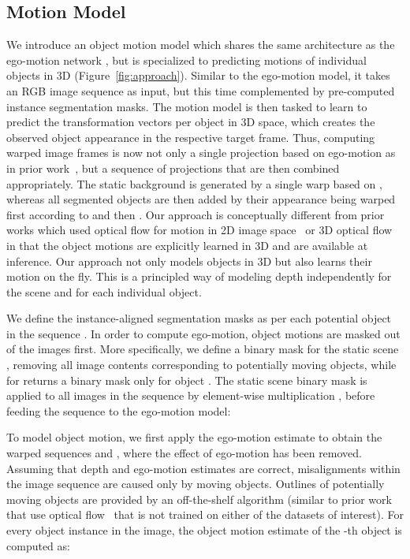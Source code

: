 \documentclass[letterpaper]{article} \usepackage{aaai19}  \usepackage{times}  \usepackage{helvet}  \usepackage{courier}  \usepackage{url}  \usepackage{graphicx}  \frenchspacing
\begin{document}
\subsection{Motion Model}
We introduce an object motion model  which shares the same architecture as the ego-motion network , but is specialized to predicting motions of individual objects in 3D (Figure~\ref{fig:approach}). Similar to the ego-motion model, it takes an RGB image sequence as input, but this time complemented by pre-computed instance segmentation masks. The motion model is then tasked to learn to predict the transformation vectors per object in 3D space, which creates the observed object appearance in the respective target frame. Thus, computing warped image frames is now not only a single projection based on ego-motion as in prior work~\cite{zhou2017unsupervised}, but a sequence of projections that are then combined appropriately. The static background is generated by a single warp based on , whereas all segmented objects are then added by their appearance being warped first according to  and then . Our approach is conceptually different from prior works which used optical flow for motion in 2D image space~\cite{yin2018geonet} or 3D optical flow~\cite{yang2018every} in that the object motions are explicitly learned in 3D and are available at inference. Our approach not only models objects in 3D but also learns their motion on the fly. This is a principled way of modeling depth independently for the scene and for each individual object.

We define the instance-aligned segmentation masks as  per each potential object  in the sequence .
In order to compute ego-motion, object motions are masked out of the images first. More specifically, we define a binary mask for the static scene , removing all image contents corresponding to potentially moving objects, while  for  returns a binary mask only for object . The static scene binary mask is applied to all images in the sequence by element-wise multiplication ,
before feeding the sequence to the ego-motion model:



\noindent To model object motion, we first apply the ego-motion estimate to obtain the warped sequences  and , where the effect of ego-motion has been removed. 
Assuming that depth and ego-motion estimates are correct, misalignments within the image sequence are caused only by moving objects. Outlines of potentially moving objects are provided by an off-the-shelf algorithm \cite{he2017mask} (similar to prior work that use optical flow~\cite{yang2018every} that is not trained on either of the datasets of interest). For every object instance in the image, the object motion estimate  of the -th object is computed as:
\end{document}
